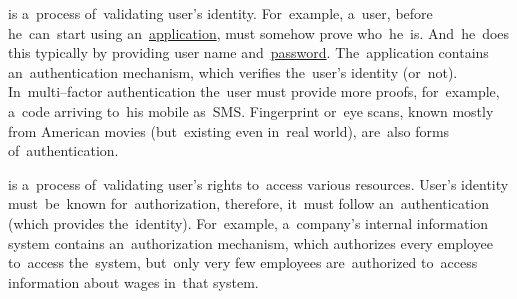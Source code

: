 \label{authenticationauthorization}
\begin{itemize}
     is a~process of~validating user's identity.
            For~example, a~user, before he~can~start using an~\hyperref[applicationprocessprogramservicethread]{application}, must somehow prove who~he~is.
            And~he~does this typically by providing user name and~\hyperref[keypassword]{password}.
            The~application contains an~authentication mechanism, which verifies the~user's identity (or~not).
            In~multi--factor authentication the~user must provide more proofs, for~example, a~code arriving to~his mobile as~SMS.
            Fingerprint or~eye scans, known mostly from American movies (but~existing even in~real world), are~also forms of~authentication.
\end{itemize}
\newpage

\begin{itemize}
     is a~process of~validating user's rights to~access various resources.
            User's identity must~be~known for~authorization, therefore, it~must follow an~authentication (which provides the~identity).
            For~example, a~company's internal information system contains an~authorization mechanism, which authorizes every employee to~access the~system, but~only very few employees are~authorized to~access information about wages in~that system.
\end{itemize}

